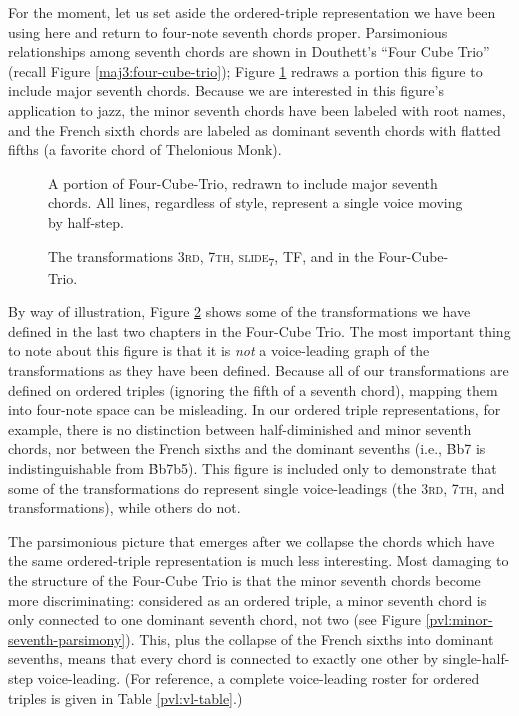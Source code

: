 For the moment, let us set aside the ordered-triple representation we have
been using here and return to four-note seventh chords proper. Parsimonious
relationships among seventh chords are shown in Douthett's ``Four Cube Trio''
(recall Figure \ref{maj3:four-cube-trio}); Figure \ref{pvl:four-cube-correct}
redraws a portion this figure to include major seventh chords.
Because we are interested in this figure's application to jazz, the minor
seventh chords have been labeled with root names, and the French sixth chords
are labeled as dominant seventh chords with flatted fifths (a favorite chord of
Thelonious Monk).

\begin{figure}[tbp]
  \caption[A portion of Four-Cube-Trio, redrawn to include major seventh
  chords.]{A portion of Four-Cube-Trio, redrawn to include major seventh
    chords. All lines, regardless of style, represent a single voice moving by
    half-step.}
  \label{pvl:four-cube-correct}
\end{figure}

\begin{figure}[tbp]
  \caption{The transformations 3\textsc{rd}, 7\textsc{th},
    \textsc{slide}\textsubscript{7}, TF, and \tft in the Four-Cube-Trio.}
  \label{pvl:four-cube-transformations}
\end{figure}

By way of illustration, Figure \ref{pvl:four-cube-transformations} shows some
of the transformations we have defined in the last two chapters in the
Four-Cube Trio. The most important thing to note about this figure is that it
is \emph{not} a voice-leading graph of the transformations as they have been
defined. Because all of our transformations are defined on ordered triples
(ignoring the fifth of a seventh chord), mapping them into four-note space can
be misleading. In our ordered triple representations, for example, there is no
distinction between half-diminished and minor seventh chords, nor between the
French sixths and the dominant sevenths (i.e., \h{Bb7} is indistinguishable
from \h{Bb7b5}). This figure is included only to demonstrate that some of the
transformations do represent single voice-leadings (the \textsc{3rd},
\textsc{7th}, and \slideS transformations), while others do not.

The parsimonious picture that emerges after we collapse the chords which have
the same ordered-triple representation is much less interesting.
Most damaging to the structure of the Four-Cube Trio is that the minor seventh
chords become more discriminating: considered as an ordered triple, a minor
seventh chord is only connected to one dominant seventh chord, not two (see
Figure \ref{pvl:minor-seventh-parsimony}). This, plus the collapse of the
French sixths into dominant sevenths, means that every chord is connected to
exactly one other by single-half-step voice-leading. (For reference, a
complete voice-leading roster for ordered triples is given in Table
\ref{pvl:vl-table}.)

